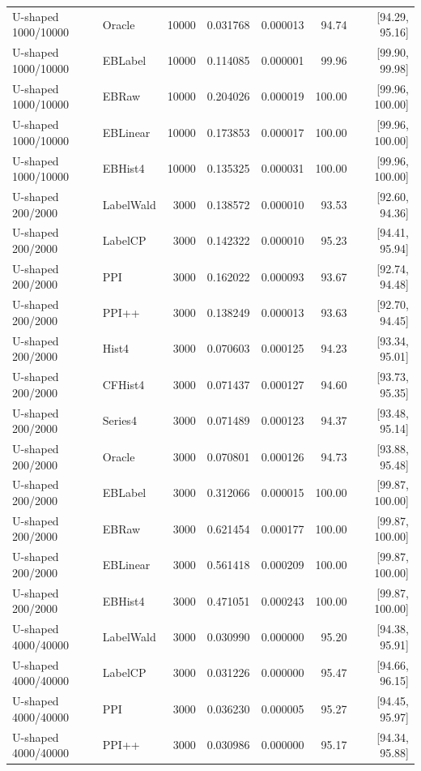 \begin{longtable}{llrrrrr}
U-shaped 1000/10000 & Oracle & 10000 & 0.031768 & 0.000013 & 94.74 & [94.29, 95.16]\\
U-shaped 1000/10000 & EBLabel & 10000 & 0.114085 & 0.000001 & 99.96 & [99.90, 99.98]\\
U-shaped 1000/10000 & EBRaw & 10000 & 0.204026 & 0.000019 & 100.00 & [99.96, 100.00]\\
U-shaped 1000/10000 & EBLinear & 10000 & 0.173853 & 0.000017 & 100.00 & [99.96, 100.00]\\
U-shaped 1000/10000 & EBHist4 & 10000 & 0.135325 & 0.000031 & 100.00 & [99.96, 100.00]\\
U-shaped 200/2000 & LabelWald & 3000 & 0.138572 & 0.000010 & 93.53 & [92.60, 94.36]\\
U-shaped 200/2000 & LabelCP & 3000 & 0.142322 & 0.000010 & 95.23 & [94.41, 95.94]\\
U-shaped 200/2000 & PPI & 3000 & 0.162022 & 0.000093 & 93.67 & [92.74, 94.48]\\
U-shaped 200/2000 & PPI++ & 3000 & 0.138249 & 0.000013 & 93.63 & [92.70, 94.45]\\
U-shaped 200/2000 & Hist4 & 3000 & 0.070603 & 0.000125 & 94.23 & [93.34, 95.01]\\
U-shaped 200/2000 & CFHist4 & 3000 & 0.071437 & 0.000127 & 94.60 & [93.73, 95.35]\\
U-shaped 200/2000 & Series4 & 3000 & 0.071489 & 0.000123 & 94.37 & [93.48, 95.14]\\
U-shaped 200/2000 & Oracle & 3000 & 0.070801 & 0.000126 & 94.73 & [93.88, 95.48]\\
U-shaped 200/2000 & EBLabel & 3000 & 0.312066 & 0.000015 & 100.00 & [99.87, 100.00]\\
U-shaped 200/2000 & EBRaw & 3000 & 0.621454 & 0.000177 & 100.00 & [99.87, 100.00]\\
U-shaped 200/2000 & EBLinear & 3000 & 0.561418 & 0.000209 & 100.00 & [99.87, 100.00]\\
U-shaped 200/2000 & EBHist4 & 3000 & 0.471051 & 0.000243 & 100.00 & [99.87, 100.00]\\
U-shaped 4000/40000 & LabelWald & 3000 & 0.030990 & 0.000000 & 95.20 & [94.38, 95.91]\\
U-shaped 4000/40000 & LabelCP & 3000 & 0.031226 & 0.000000 & 95.47 & [94.66, 96.15]\\
U-shaped 4000/40000 & PPI & 3000 & 0.036230 & 0.000005 & 95.27 & [94.45, 95.97]\\
U-shaped 4000/40000 & PPI++ & 3000 & 0.030986 & 0.000000 & 95.17 & [94.34, 95.88]\\

\end{longtable}
